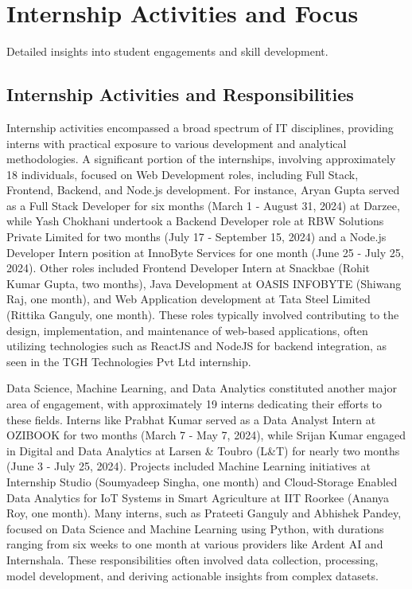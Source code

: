 \documentclass[11pt,a4paper]{article}
\newenvironment{card}{
    \begin{tcolorbox}[
        enhanced,
        colback=cardback,
        colframe=border,
        sharp corners,
        boxrule=0.5pt,
        drop shadow,
        shadow xshift=1mm,
        shadow yshift=-1mm,
        shadow color=border!50,
        boxsep=3mm,
        left=5mm, right=5mm, top=5mm, bottom=5mm,
        width=\textwidth,
        nobeforeafter
    ]
}{\end{tcolorbox}}
\begin{document}
\clearpage

\section*{\textcolor{accent}{Internship Activities and Focus}}
{\large\textcolor{muted}{Detailed insights into student engagements and skill development.}}

\vspace{0.5cm}

\begin{card}
    \subsection*{\textcolor{accent}{Internship Activities and Responsibilities}}
    \vspace{0.3cm}
    Internship activities encompassed a broad spectrum of IT disciplines, providing interns with practical exposure to various development and analytical methodologies. A significant portion of the internships, involving approximately 18 individuals, focused on Web Development roles, including Full Stack, Frontend, Backend, and Node.js development. For instance, Aryan Gupta served as a Full Stack Developer for six months (March 1 - August 31, 2024) at Darzee, while Yash Chokhani undertook a Backend Developer role at RBW Solutions Private Limited for two months (July 17 - September 15, 2024) and a Node.js Developer Intern position at InnoByte Services for one month (June 25 - July 25, 2024). Other roles included Frontend Developer Intern at Snackbae (Rohit Kumar Gupta, two months), Java Development at OASIS INFOBYTE (Shiwang Raj, one month), and Web Application development at Tata Steel Limited (Rittika Ganguly, one month). These roles typically involved contributing to the design, implementation, and maintenance of web-based applications, often utilizing technologies such as ReactJS and NodeJS for backend integration, as seen in the TGH Technologies Pvt Ltd internship.

    Data Science, Machine Learning, and Data Analytics constituted another major area of engagement, with approximately 19 interns dedicating their efforts to these fields. Interns like Prabhat Kumar served as a Data Analyst Intern at OZIBOOK for two months (March 7 - May 7, 2024), while Srijan Kumar engaged in Digital and Data Analytics at Larsen \& Toubro (L\&T) for nearly two months (June 3 - July 25, 2024). Projects included Machine Learning initiatives at Internship Studio (Soumyadeep Singha, one month) and Cloud-Storage Enabled Data Analytics for IoT Systems in Smart Agriculture at IIT Roorkee (Ananya Roy, one month). Many interns, such as Prateeti Ganguly and Abhishek Pandey, focused on Data Science and Machine Learning using Python, with durations ranging from six weeks to one month at various providers like Ardent AI and Internshala. These responsibilities often involved data collection, processing, model development, and deriving actionable insights from complex datasets.


\end{card}
\end{document}
